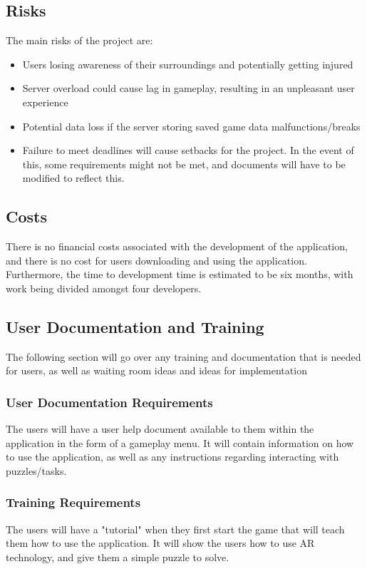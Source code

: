 \documentclass[12pt]{article}
\begin{document}
\subsection{Risks}
The main risks of the project are:
\begin{itemize}
    \item Users losing awareness of their surroundings and potentially getting injured
    \item Server overload could cause lag in gameplay, resulting in an unpleasant user experience
    \item Potential data loss if the server storing saved game data malfunctions/breaks
    \item Failure to meet deadlines will cause setbacks for the project. In the event of this, some requirements might not be met, and documents will have to be modified to reflect this. 
\end{itemize}

\subsection{Costs}
There is no financial costs associated with the development of the application, and there is no cost for users downloading and using the application. Furthermore, the time to development time is estimated to be six months, with work being divided amongst four developers.

\subsection{User Documentation and Training}
The following section will go over any training and documentation that is needed for users, as well as waiting room ideas and ideas for implementation
\subsubsection{User Documentation Requirements}
The users will have a user help document available to them within the application in the form of a gameplay menu. It will contain information on how to use the application, as well as any instructions regarding interacting with puzzles/tasks.

\subsubsection{Training Requirements}
The users will have a "tutorial" when they first start the game that will teach them how to use the application. It will show the users how to use AR technology, and give them a simple puzzle to solve.
\end{document}
